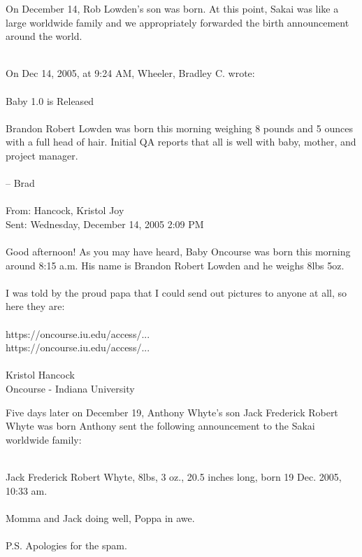 \documentclass[12pt]{book}
\begin{document}
On December 14, Rob Lowden's son was born.
At this point, Sakai was like a large worldwide family
and we appropriately forwarded the
birth announcement around the world.\\
\\
\begin{sf}
On Dec 14, 2005, at 9:24 AM, Wheeler, Bradley C. wrote:\\
\\
Baby 1.0 is Released\\
\\
Brandon Robert Lowden was born this morning weighing
8 pounds and 5 ounces with a full head of hair.
Initial QA reports that all is well with baby,
mother, and project manager.\\
\\
-- Brad\\
\\
From: Hancock, Kristol Joy\\
Sent: Wednesday, December 14, 2005 2:09 PM\\
\\
Good afternoon!  As you may have heard, Baby Oncourse
was born this morning around 8:15 a.m.  His name is
Brandon Robert Lowden and he weighs 8lbs 5oz.\\
\\
I was told by the proud papa that I could send out
pictures to anyone at all, so here they are:\\
\\
https://oncourse.iu.edu/access/...\\
https://oncourse.iu.edu/access/...\\
\\
Kristol Hancock\\
Oncourse - Indiana University\\
\end{sf}


Five days later on December 19, Anthony Whyte's son
Jack Frederick Robert Whyte was born
Anthony sent the following announcement to
the Sakai worldwide family:\\
\\
\begin{sf}
Jack Frederick Robert Whyte, 8lbs, 3 oz., 20.5
inches long, born 19 Dec.  2005, 10:33 am.  \\
\\
Momma and Jack doing well, Poppa in awe.\\
\\
P.S.  Apologies for the spam.\\
\end{sf}
\end{document}
